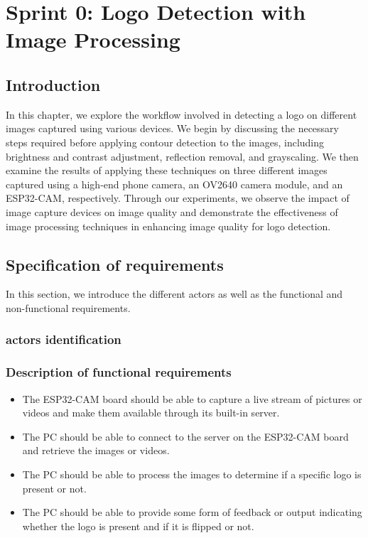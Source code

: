 %
%


\chapter{Sprint 0: Logo Detection with Image Processing}

\section{Introduction}
In this chapter, we explore the workflow involved in detecting a logo on different images captured using various devices. We begin by discussing the necessary steps required before applying contour detection to the images, including brightness and contrast adjustment, reflection removal, and grayscaling. We then examine the results of applying these techniques on three different images captured using a high-end phone camera, an OV2640 camera module, and an ESP32-CAM, respectively. Through our experiments, we observe the impact of image capture devices on image quality and demonstrate the effectiveness of image processing techniques in enhancing image quality for logo detection.
\section{Specification of requirements}
In this section, we introduce the different actors as well as the functional and non-functional requirements.
\subsection{actors identification }
\subsection{Description of functional requirements}
\begin{itemize}
\item The ESP32-CAM board should be able to capture a live stream of pictures or videos and make them available through its built-in server.
\item The PC should be able to connect to the server on the ESP32-CAM board and retrieve the images or videos.
\item The PC should be able to process the images to determine if a specific logo is present or not.
\item The PC should be able to provide some form of feedback or output indicating whether the logo is present and if it is flipped or not.
\end{itemize}
